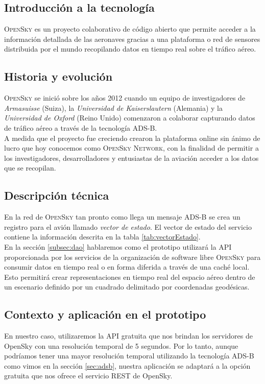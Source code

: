 \documentclass[a4paper, 11pt]{book}
\begin{document}
\subsection{Introducción a la tecnología}
\textsc{OpenSky} es un proyecto colaborativo de código abierto que permite acceder a la información detallada de las aeronaves gracias a una plataforma o red de sensores distribuida por el mundo recopilando datos en tiempo real sobre el tráfico aéreo.
\subsection{Historia y evolución}
\textsc{OpenSky} se inició sobre los años 2012 cuando un equipo de investigadores de \emph{Armasuisse} (Suiza), la \emph{Universidad de Kaiserslautern} (Alemania) y la \emph{Universidad de Oxford} (Reino Unido) comenzaron a colaborar capturando datos de tráfico aéreo a través de la tecnología \textsc{ADS-B}.\\
A medida que el proyecto fue creciendo crearon la plataforma online sin ánimo de lucro que hoy conocemos como \textsc{OpenSky Network}, con la finalidad de permitir a los investigadores, desarrolladores y entusiastas de la aviación acceder a los datos que se recopilan.
\subsection{Descripción técnica}
En la red de \textsc{OpenSky} tan pronto como llega un mensaje \textsc{ADS-B} se crea un registro para el avión llamado \emph{vector de estado}.
El vector de estado del servicio contiene la información descrita en la tabla \ref{tab:vectorEstado}.\\
En la sección \ref{subsec:dao} hablaremos como el prototipo utilizará la \textsc{API} proporcionada por los servicios de la organización de software libre \textsc{OpenSky} para consumir datos en tiempo real o en forma diferida a través de una caché local. Esto permitirá crear representaciones en tiempo real del espacio aéreo dentro de un escenario definido por un cuadrado delimitado por coordenadas geodésicas.

\subsection{Contexto y aplicación en el prototipo}
En nuestro caso, utilizaremos la API gratuita que nos brindan los servidores de OpenSky con una resolución temporal de 5 segundos. Por lo tanto, aunque podríamos tener una mayor resolución temporal utilizando la tecnología ADS-B como vimos en la sección \ref{sec:adsb}, nuestra aplicación se adaptará a la opción gratuita que nos ofrece el servicio REST de OpenSky.
\end{document}
